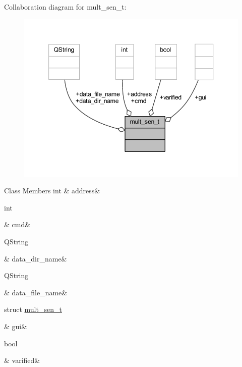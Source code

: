 Collaboration diagram for mult\+\_\+sen\+\_\+t\+:
\nopagebreak
\begin{figure}[H]
\begin{center}
\leavevmode
\includegraphics[width=347pt]{d6/d22/a00245}
\end{center}
\end{figure}
\begin{DoxyFields}{Class Members}
\hypertarget{a00001_acc8ad431836f7b42742eda4fd49385b2}{int}\label{a00001_acc8ad431836f7b42742eda4fd49385b2}
&
address&
\\
\hline

\hypertarget{a00001_aa5ce3f5ea778b071a624dec2dda2a268}{int}\label{a00001_aa5ce3f5ea778b071a624dec2dda2a268}
&
cmd&
\\
\hline

\hypertarget{a00001_ab96a1a110eea887a27173c37866e876e}{Q\+String}\label{a00001_ab96a1a110eea887a27173c37866e876e}
&
data\+\_\+dir\+\_\+name&
\\
\hline

\hypertarget{a00001_a76c985468c91b36f693cbaf858297d9f}{Q\+String}\label{a00001_a76c985468c91b36f693cbaf858297d9f}
&
data\+\_\+file\+\_\+name&
\\
\hline

\hypertarget{a00001_a7758f566562596be39abf215046e32f0}{struct \hyperlink{a00001_db/dab/a00089}{mult\+\_\+sen\+\_\+t}}\label{a00001_a7758f566562596be39abf215046e32f0}
&
gui&
\\
\hline

\hypertarget{a00001_a0438d70fa5f3dd26987180982ee28352}{bool}\label{a00001_a0438d70fa5f3dd26987180982ee28352}
&
varified&
\\
\hline

\end{DoxyFields}
\label{dc/ddf/a00067}
\hypertarget{a00001_dc/ddf/a00067}{}
